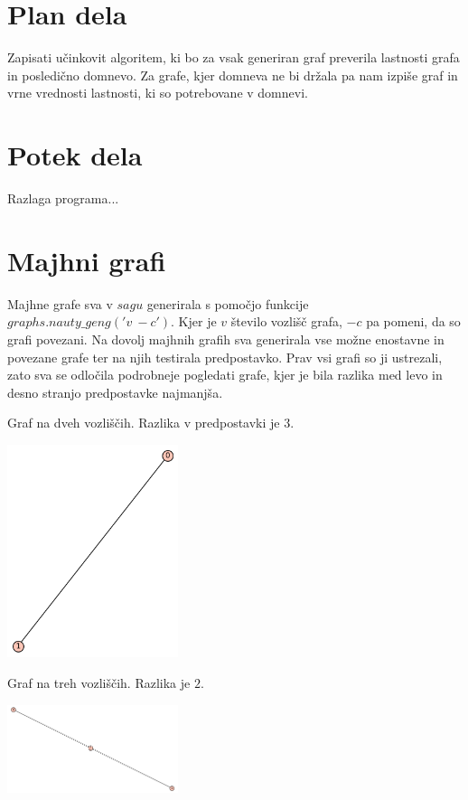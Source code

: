 \documentclass[10pt, a4paper]{article}
\begin{document}
\section{Plan dela}
Zapisati učinkovit algoritem, ki bo za vsak generiran graf preverila lastnosti grafa in posledično domnevo. Za grafe, kjer  domneva ne bi držala pa nam izpiše graf in vrne vrednosti lastnosti, ki so potrebovane v domnevi.

\section{Potek dela}

Razlaga programa...

\section{Majhni grafi}

Majhne grafe sva v $sagu$ generirala s pomočjo funkcije $graphs.nauty\_geng('v\ -c')$. Kjer je $v$ število vozlišč grafa, $-c$ pa pomeni, da so grafi povezani. Na dovolj majhnih grafih sva generirala vse možne enostavne in povezane grafe ter na njih testirala predpostavko. Prav vsi grafi so ji ustrezali, zato sva se odločila podrobneje pogledati grafe, kjer je bila razlika med levo in desno stranjo predpostavke najmanjša.

Graf na dveh vozliščih. Razlika v predpostavki je $3$.

\includegraphics[width=5cm]{min_graf_2_vozlisci}

Graf na treh vozliščih. Razlika je $2$.

\includegraphics[width=5cm]{min_graf_3_vozlisca}
\end{document}
